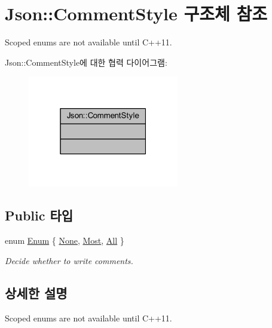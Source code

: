 \hypertarget{struct_json_1_1_comment_style}{}\section{Json\+:\+:Comment\+Style 구조체 참조}
\label{struct_json_1_1_comment_style}


Scoped enums are not available until C++11.  




Json\+:\+:Comment\+Style에 대한 협력 다이어그램\+:\nopagebreak
\begin{figure}[H]
\begin{center}
\leavevmode
\includegraphics[width=187pt]{struct_json_1_1_comment_style__coll__graph}
\end{center}
\end{figure}
\subsection*{Public 타입}
\begin{DoxyCompactItemize}
\item 
enum \hyperlink{struct_json_1_1_comment_style_a51fc08f3518fd81eba12f340d19a3d0c}{Enum} \{ \hyperlink{struct_json_1_1_comment_style_a51fc08f3518fd81eba12f340d19a3d0cac8b32a8bae63414c8647d4919da8d437}{None}, 
\hyperlink{struct_json_1_1_comment_style_a51fc08f3518fd81eba12f340d19a3d0cac65238f050773c107690a456e9c05c98}{Most}, 
\hyperlink{struct_json_1_1_comment_style_a51fc08f3518fd81eba12f340d19a3d0ca32302c0b97190c1808b3e38f367fef01}{All}
 \}\begin{DoxyCompactList}\small\item\em Decide whether to write comments. \end{DoxyCompactList}
\end{DoxyCompactItemize}


\subsection{상세한 설명}
Scoped enums are not available until C++11. 

